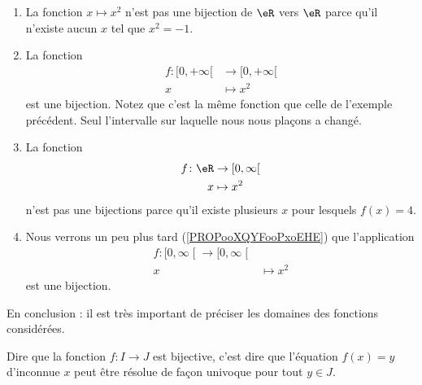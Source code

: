 \begin{example}     \label{EXooCWYHooLEciVj}
    \begin{enumerate}
        \item
            La fonction \( x\mapsto x^2\) n'est pas une bijection de \( \eR\) vers \( \eR\) parce qu'il n'existe aucun \( x\) tel que \( x^2=-1\).
        \item
            La fonction 
            \begin{equation}
                \begin{aligned}
                    f\colon \mathopen[ 0 , +\infty [&\to \mathopen[ 0 , +\infty [ \\
                    x&\mapsto x^2 
                \end{aligned}
            \end{equation}
            est une bijection. Notez que c'est la même fonction que celle de l'exemple précédent. Seul l'intervalle sur laquelle nous nous plaçons a changé.
        \item
            La fonction
            \begin{equation}
                \begin{aligned}
                    f\colon \eR&\to \mathopen[ 0 , \infty \mathclose[ \\
                    x&\mapsto x^2 
                \end{aligned}
            \end{equation}
            n'est pas une bijections parce qu'il existe plusieurs \( x\) pour lesquels \( f(x)=4\).
        \item
            Nous verrons un peu plus tard (\ref{PROPooXQYFooPxoEHE}) que l'application
            \begin{equation}
                \begin{aligned}
                    f\colon \mathopen[ 0 , \infty \mathclose[\to \mathopen[ 0 , \infty \mathclose[\\
                    x&\mapsto x^2 
                \end{aligned}
            \end{equation}
            est une bijection.
    \end{enumerate}
    En conclusion : il est très important de préciser les domaines des fonctions considérées.
\end{example}

\begin{remark}
    Dire que la fonction \( f\colon I\to J\) est bijective, c'est dire que l'équation \( f(x)=y\) d'inconnue \( x\) peut être résolue de façon univoque pour tout \( y\in J\).
\end{remark}

